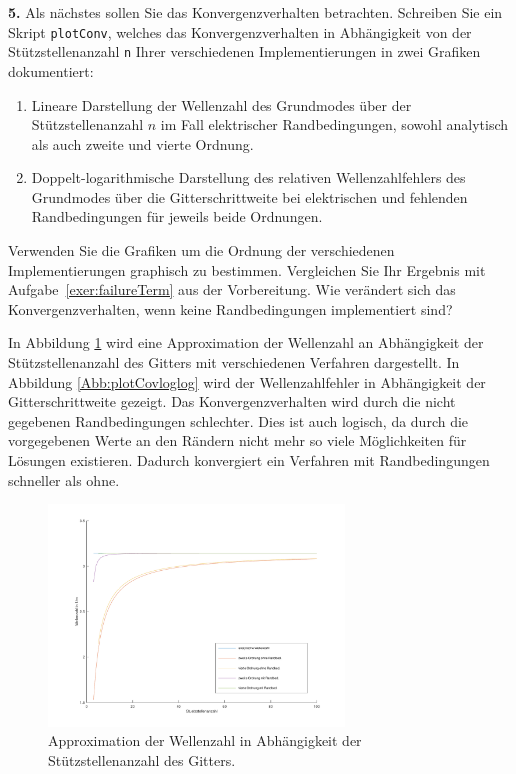 \documentclass[Protokollheft.tex]{subfiles}
\begin{document}
	\begin{framed}
		\noindent \textbf{5.} Als nächstes sollen Sie das Konvergenzverhalten betrachten. Schreiben Sie ein Skript \lstinline{plotConv}, welches das Konvergenzverhalten in Abhängigkeit von der Stützstellenanzahl \lstinline{n}
		Ihrer verschiedenen Implementierungen in zwei Grafiken dokumentiert:
		\begin{enumerate}
			\item Lineare Darstellung der Wellenzahl des Grundmodes über der Stützstellenanzahl $n$ im Fall elektrischer Randbedingungen, sowohl analytisch als auch zweite und vierte Ordnung.
			\item Doppelt-logarithmische Darstellung des relativen Wellenzahlfehlers des Grundmodes  über die Gitterschrittweite bei elektrischen und fehlenden Randbedingungen für jeweils beide Ordnungen.
		\end{enumerate}
		Verwenden Sie die Grafiken um die Ordnung der verschiedenen Implementierungen graphisch zu bestimmen. Vergleichen Sie Ihr Ergebnis
		mit Aufgabe~\ref{exer:failureTerm} aus der Vorbereitung.  Wie verändert sich das Konvergenzverhalten, wenn keine Randbedingungen implementiert sind?\label{exer:plotConv}
	\end{framed}
	\noindent
	In Abbildung \ref{Abb:plotCov} wird eine Approximation der Wellenzahl an Abhängigkeit der Stützstellenanzahl des Gitters mit verschiedenen Verfahren dargestellt. In Abbildung \ref{Abb:plotCovloglog} wird der Wellenzahlfehler in Abhängigkeit der Gitterschrittweite gezeigt. Das Konvergenzverhalten wird durch die nicht gegebenen Randbedingungen schlechter. Dies ist auch logisch, da durch die vorgegebenen Werte an den Rändern nicht mehr so viele Möglichkeiten für Lösungen existieren. Dadurch konvergiert ein Verfahren mit Randbedingungen schneller als ohne. 
	\begin{figure}[h]
		\centering
		\includegraphics[trim = 25mm 10mm 25mm 15mm, clip, width=0.7\textwidth]{plotConv.pdf}
		\caption{Approximation der Wellenzahl in Abhängigkeit der Stützstellenanzahl des Gitters.}
		\label{Abb:plotCov}
	\end{figure}
\end{document}
